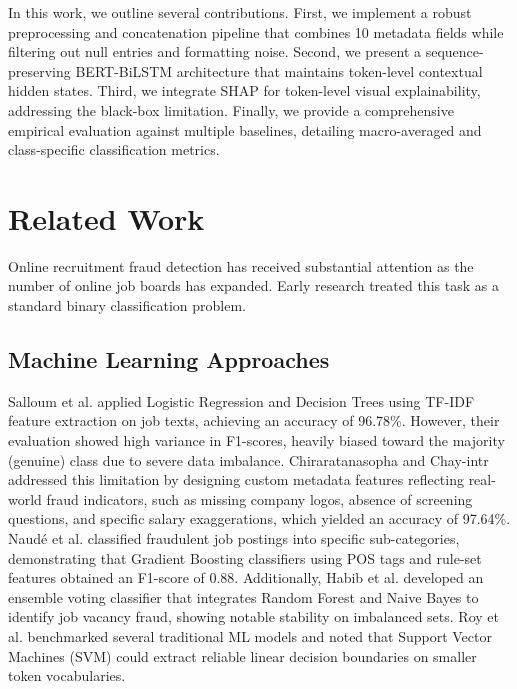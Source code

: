 \documentclass[conference]{IEEEtran}
\begin{document}
In this work, we outline several contributions. First, we implement a robust preprocessing and concatenation pipeline that combines 10 metadata fields while filtering out null entries and formatting noise. Second, we present a sequence-preserving BERT-BiLSTM architecture that maintains token-level contextual hidden states. Third, we integrate SHAP for token-level visual explainability, addressing the black-box limitation. Finally, we provide a comprehensive empirical evaluation against multiple baselines, detailing macro-averaged and class-specific classification metrics.

\section{Related Work}
Online recruitment fraud detection has received substantial attention as the number of online job boards has expanded. Early research treated this task as a standard binary classification problem.

\subsection{Machine Learning Approaches}
Salloum et al. \cite{salloum2024analysis} applied Logistic Regression and Decision Trees using TF-IDF feature extraction on job texts, achieving an accuracy of 96.78\%. However, their evaluation showed high variance in F1-scores, heavily biased toward the majority (genuine) class due to severe data imbalance. Chiraratanasopha and Chay-intr \cite{chiraratanasopha2022detecting} addressed this limitation by designing custom metadata features reflecting real-world fraud indicators, such as missing company logos, absence of screening questions, and specific salary exaggerations, which yielded an accuracy of 97.64\%. Naud{\'e} et al. \cite{naude2023machine} classified fraudulent job postings into specific sub-categories, demonstrating that Gradient Boosting classifiers using POS tags and rule-set features obtained an F1-score of 0.88. Additionally, Habib et al. \cite{habib2021fake} developed an ensemble voting classifier that integrates Random Forest and Naive Bayes to identify job vacancy fraud, showing notable stability on imbalanced sets. Roy et al. \cite{roy2020fake} benchmarked several traditional ML models and noted that Support Vector Machines (SVM) could extract reliable linear decision boundaries on smaller token vocabularies.
\end{document}

